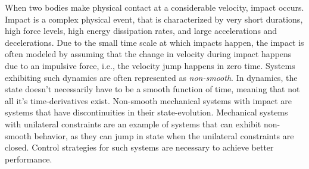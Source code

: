 \documentclass[../DC2017114Bouma.tex]{subfiles}
\begin{document}
When two bodies make physical contact at a considerable velocity, impact occurs. Impact is a complex physical event, that is characterized by very short durations, high force levels, high energy dissipation rates, and large accelerations and decelerations. Due to the small time scale at which impacts happen, the impact is often modeled by assuming that the change in velocity during impact happens due to an impulsive force, i.e., the velocity jump happens in zero time. Systems exhibiting such dynamics are often represented as \textit{non-smooth}. In dynamics, the state doesn't necessarily have to be a smooth function of time, meaning that not all it's time-derivatives exist. Non-smooth mechanical systems with impact are systems that have discontinuities in their state-evolution. Mechanical systems with unilateral constraints are an example of systems that can exhibit non-smooth behavior, as they can jump in state when the unilateral constraints are closed. Control strategies for such systems are necessary to achieve better performance. 
\end{document}
